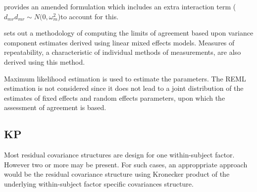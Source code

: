 \documentclass[12pt, a4paper]{report}
\theoremstyle{plain}
\theoremstyle{definition}
\theoremstyle{remark}
\begin{document}
\citet{BXC2004} provides an amended formulation which includes an extra interaction
term ($d_{mr} d_{mr} \sim N(0,\omega^{2}_{m}$)to account for this.

\citet{BXC2008} sets out a methodology of computing the limits of
agreement based upon variance component estimates derived using
linear mixed effects models. Measures of repeatability, a
characteristic of individual methods of measurements, are also
derived using this method.





Maximum likelihood estimation is used to estimate the parameters.
The REML estimation is not considered since it does not lead to a
joint distribution of the estimates of fixed effects and random
effects parameters, upon which the assessment of agreement is
based.



\subsection{KP}
Most residual covariance structures are design for one
within-subject factor. However two or more may be present. For
such cases, an approppriate approach would be the residual
covariance structure using Kronecker product of the underlying
within-subject factor specific covariances structure.
\end{document}
